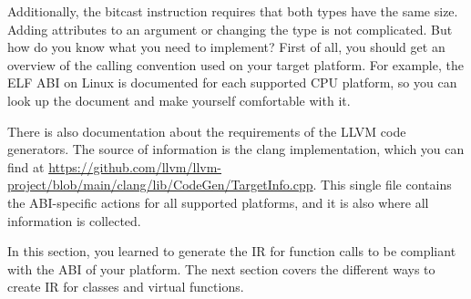 \begin{shell}
\end{shell}

Additionally, the bitcast instruction requires that both types have the same size.
Adding attributes to an argument or changing the type is not complicated. But how do you know what you need to implement? First of all, you should get an overview of the calling convention used on your target platform. For example, the ELF ABI on Linux is documented for each supported CPU platform, so you can look up the document and make yourself comfortable with it.

There is also documentation about the requirements of the LLVM code generators. The source of information is the clang implementation, which you can find at \url{https://github.com/llvm/llvm-project/blob/main/clang/lib/CodeGen/TargetInfo.cpp}. This single file contains the ABI-specific actions for all supported platforms, and it is also where all information is collected.

In this section, you learned to generate the IR for function calls to be compliant with the ABI of your platform. The next section covers the different ways to create IR for classes and virtual functions.




















































